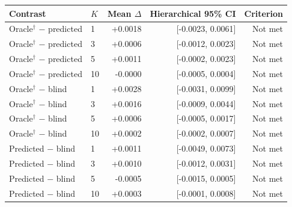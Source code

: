 \begin{tabular}{llrrr}
\toprule
Contrast & $K$ & Mean $\Delta$ & Hierarchical 95\% CI & Criterion \\
\midrule
Oracle$^{\dagger}$ $-$ predicted & 1 & +0.0018 & [-0.0023, 0.0061] & Not met \\
Oracle$^{\dagger}$ $-$ predicted & 3 & +0.0006 & [-0.0012, 0.0023] & Not met \\
Oracle$^{\dagger}$ $-$ predicted & 5 & +0.0011 & [-0.0002, 0.0023] & Not met \\
Oracle$^{\dagger}$ $-$ predicted & 10 & -0.0000 & [-0.0005, 0.0004] & Not met \\
Oracle$^{\dagger}$ $-$ blind & 1 & +0.0028 & [-0.0031, 0.0099] & Not met \\
Oracle$^{\dagger}$ $-$ blind & 3 & +0.0016 & [-0.0009, 0.0044] & Not met \\
Oracle$^{\dagger}$ $-$ blind & 5 & +0.0006 & [-0.0005, 0.0017] & Not met \\
Oracle$^{\dagger}$ $-$ blind & 10 & +0.0002 & [-0.0002, 0.0007] & Not met \\
Predicted $-$ blind & 1 & +0.0011 & [-0.0049, 0.0073] & Not met \\
Predicted $-$ blind & 3 & +0.0010 & [-0.0012, 0.0031] & Not met \\
Predicted $-$ blind & 5 & -0.0005 & [-0.0015, 0.0005] & Not met \\
Predicted $-$ blind & 10 & +0.0003 & [-0.0001, 0.0008] & Not met \\
\bottomrule
\end{tabular}
